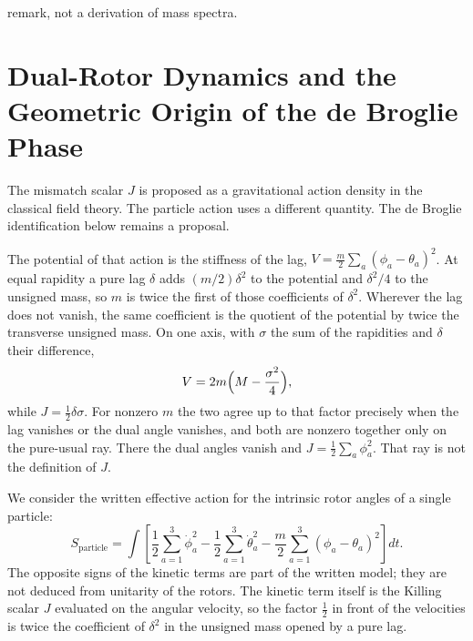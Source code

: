 \documentclass[a4paper]{article}
\begin{document}
remark, not a derivation of mass spectra.

\section{Dual-Rotor Dynamics and the Geometric Origin of the de Broglie Phase}
\label{sec:dualrotordynamics}

The mismatch scalar $J$ is proposed as a gravitational action density in the classical field theory. The particle action uses a different quantity. The de Broglie identification below remains a proposal.

The potential of that action is the stiffness of the lag, $V=\frac{m}{2}\sum_a(\phi_a-\theta_a)^2$. At equal rapidity a pure lag \(\delta\) adds \((m/2)\delta^2\) to the potential and \(\delta^2/4\) to the unsigned mass, so \(m\) is twice the first of those coefficients of \(\delta^2\). Wherever the lag does not vanish, the same coefficient is the quotient of the potential by twice the transverse unsigned mass. On one axis, with $\sigma$ the sum of the rapidities and $\delta$ their difference,
\begin{equation}
\label{eq:stiffness-mass}
V=2m\Bigl(M-\frac{\sigma^2}{4}\Bigr),
\end{equation}
while $J=\tfrac12\delta\sigma$. For nonzero $m$ the two agree up to that factor precisely when the lag vanishes or the dual angle vanishes, and both are nonzero together only on the pure-usual ray. There the dual angles vanish and $J=\tfrac12\sum_a\phi_a^2$. That ray is not the definition of $J$.

We consider the written effective action for the intrinsic rotor angles of a single particle:
\[
S_{\text{particle}} = \int \left[ \frac{1}{2} \sum_{a=1}^3 \dot{\phi}_a^2 - \frac{1}{2} \sum_{a=1}^3 \dot{\theta}_a^2 - \frac{m}{2} \sum_{a=1}^3 (\phi_a - \theta_a)^2 \right] dt.
\]
The opposite signs of the kinetic terms are part of the written model; they are not deduced from unitarity of the rotors. The kinetic term itself is the Killing scalar $J$ evaluated on the angular velocity, so the factor \(\tfrac12\) in front of the velocities is twice the coefficient of \(\delta^2\) in the unsigned mass opened by a pure lag.
\end{document}
